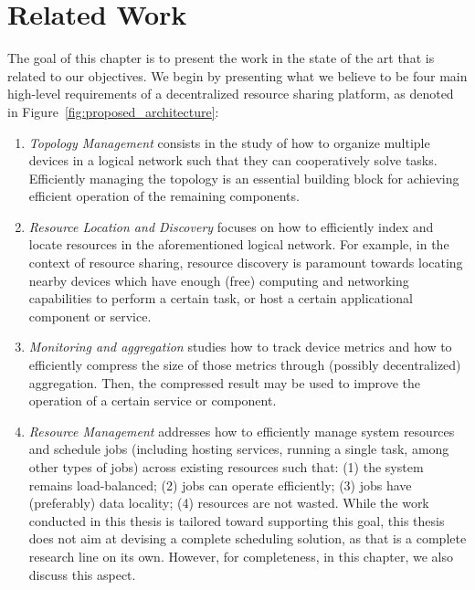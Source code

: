 \chapter{Related Work}
\label{cha:related_work}

The goal of this chapter is to present the work in the state of the art that is related to our objectives. We begin by presenting what we believe to be four main high-level requirements of a decentralized resource sharing platform, as denoted in Figure~\ref{fig:proposed_architecture}:

\begin{enumerate}

    \item \textit{Topology Management} consists in the study of how to organize multiple devices in a logical network such that they can cooperatively solve tasks. Efficiently managing the topology is an essential building block for achieving efficient operation of the remaining components.

    \item \textit{Resource Location and Discovery} focuses on how to efficiently index and locate resources in the aforementioned logical network. For example, in the context of resource sharing, resource discovery is paramount towards locating nearby devices which have enough (free) computing and networking capabilities to perform a certain task, or host a certain applicational component or service.

    \item \textit{Monitoring and aggregation} studies how to track device metrics and how to efficiently compress the size of those metrics through (possibly decentralized) aggregation. Then, the compressed result may be used to improve the operation of a certain service or component.

    \item \textit{Resource Management} addresses how to efficiently manage system resources and schedule jobs (including hosting services, running a single task, among other types of jobs) across existing resources such that: (1) the system remains load-balanced; (2) jobs can operate efficiently; (3) jobs have (preferably) data locality; (4) resources are not wasted. While the work conducted in this thesis is tailored toward supporting this goal, this thesis does not aim at devising a complete scheduling solution, as that is a complete research line on its own. However, for completeness, in this chapter, we also discuss this aspect.

\end{enumerate}

